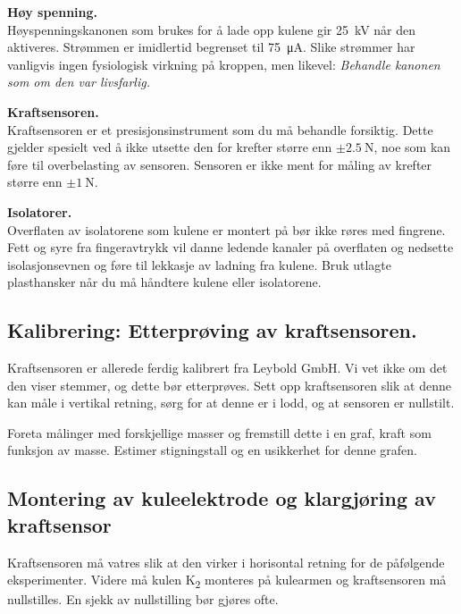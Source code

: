 \documentclass[../Elmag-labhefte-2020.tex]{subfiles}
\begin{document}
\begin{itemize}
\textbf{Høy spenning.}\\
Høyspenningskanonen som brukes for å lade opp kulene gir \SI{25}{\kilo\volt} når den aktiveres. Strømmen er imidlertid begrenset til \SI{75}{\micro\ampere}. Slike strømmer har vanligvis ingen fysiologisk virkning på kroppen, men likevel: \emph{Behandle kanonen som om den var livsfarlig.}

\textbf{Kraftsensoren.}\\
Kraftsensoren er et presisjonsinstrument som du må behandle forsiktig. Dette gjelder spesielt ved å ikke utsette den for krefter større enn $\pm \SI{2,5}{\newton}$, noe som kan føre til overbelasting av sensoren. Sensoren er ikke ment for måling av krefter større enn $\pm \SI{1}{\newton}$. 


\textbf{Isolatorer.}\\
Overflaten av isolatorene som kulene er montert på bør ikke røres med fingrene. Fett og syre fra fingeravtrykk vil danne ledende kanaler på overflaten og nedsette isolasjonsevnen og føre til lekkasje av ladning fra kulene. Bruk utlagte plasthansker når du må håndtere kulene eller isolatorene. 


\subsection{Kalibrering: Etterprøving av kraftsensoren.}

Kraftsensoren er allerede ferdig kalibrert fra Leybold GmbH. Vi vet ikke om det den viser stemmer, og dette bør etterprøves. 
Sett opp kraftsensoren slik at denne kan måle i vertikal retning, sørg for at denne er i lodd, og at sensoren er nullstilt.
 
Foreta målinger med forskjellige masser og fremstill dette i en graf, kraft som funksjon av masse. Estimer stigningstall og en usikkerhet for denne grafen.


\subsection{Montering av kuleelektrode og klargjøring av kraftsensor}

Kraftsensoren må vatres slik at den virker i horisontal retning for de påfølgende eksperimenter. Videre må kulen K\textsubscript{2} monteres på kulearmen og kraftsensoren må nullstilles. En sjekk av nullstilling bør gjøres ofte.


\end{itemize}
\end{document}
